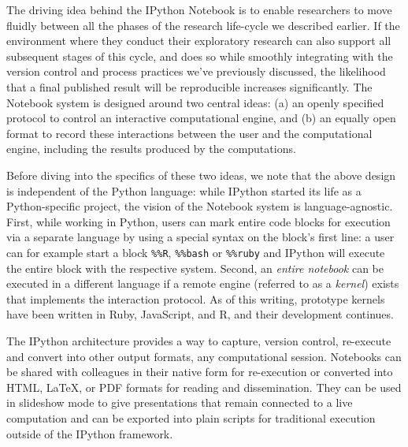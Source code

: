 \documentclass[ChapterTOCs,krantz2]{krantz} %
\theoremstyle{definition}
\begin{document}
The driving idea behind the IPython Notebook is to enable researchers to move
fluidly between all the phases of the research life-cycle we described earlier.
If the environment where they conduct their exploratory research can also
support all subsequent stages of this cycle, and does so while smoothly
integrating with the version control and process practices we've previously
discussed, the likelihood that a final published result will be reproducible
increases significantly.  The Notebook system is designed around two central
ideas: (a) an openly specified protocol to control an interactive computational
engine, and (b) an equally open format to record these interactions between the
user and the computational engine, including the results produced by the
computations.

Before diving into the specifics of these two ideas, we note that the above
design is independent of the Python language: while IPython started its life as
a Python-specific project, the vision of the Notebook system is
language-agnostic.  First, while working in Python, users can mark entire code
blocks for execution via a separate language by using a special syntax on the
block's first line: a user can for example start a block \texttt{\%\%R},
\texttt{\%\%bash} or \texttt{\%\%ruby} and IPython will execute the entire
block with the respective system.  Second, an \emph{entire notebook} can be
executed in a different language if a remote engine (referred to as a
\emph{kernel}) exists that implements the interaction protocol.  As of this
writing, prototype kernels have been written in Ruby, JavaScript, and R, and
their development continues.

The IPython architecture provides a way to capture, version control, re-execute
and convert into other output formats, any computational session.  Notebooks
can be shared with colleagues in their native form for re-execution or
converted into HTML, \LaTeX, or PDF formats for reading and dissemination.  They
can be used in slideshow mode to give presentations that remain connected to a
live computation and can be exported into plain scripts for traditional
execution outside of the IPython framework.
\end{document}
